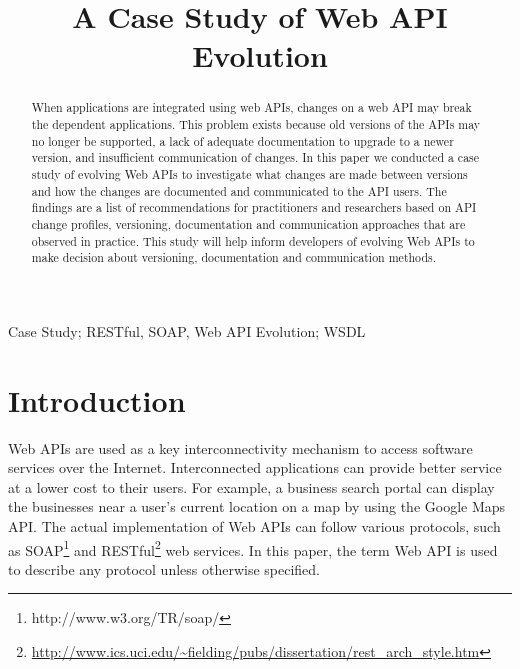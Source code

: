 \documentclass[conference]{IEEEtran}
\begin{document}
\title{A Case Study of Web API Evolution}


\author{}

\maketitle


\begin{abstract}
When applications are integrated using web APIs, changes on a web API may break the dependent applications. This problem exists because old versions of the APIs may no longer be supported, a lack of adequate documentation to upgrade to a newer version, and insufficient communication of changes. In this paper we conducted a case study of evolving Web APIs to investigate what changes are made between versions and how the changes are documented and communicated to the API users. The findings are a list of recommendations for practitioners and researchers based on API change profiles, versioning, documentation and communication approaches that are observed in practice. This study will help inform developers of evolving Web APIs to make decision about versioning, documentation and communication methods.
\end{abstract}


\begin{IEEEkeywords}
Case Study; RESTful, SOAP, Web API Evolution; WSDL
\end{IEEEkeywords}

\IEEEpeerreviewmaketitle

\section{Introduction}

Web APIs are used as a key interconnectivity mechanism to access software services over the Internet. Interconnected applications can provide better service at a lower cost to their users. For example, a business search portal can display the businesses near a user's current location on a map by using the Google Maps API. The actual implementation of Web APIs can follow various protocols, such as SOAP\footnote{http://www.w3.org/TR/soap/} and RESTful\footnote{\url{http://www.ics.uci.edu/~fielding/pubs/dissertation/rest_arch_style.htm}} web services. In this paper, the term Web API is used to describe any protocol unless otherwise specified.
\end{document}
